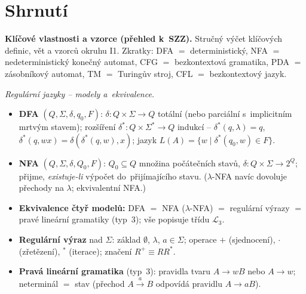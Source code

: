 \documentclass[11pt,a4paper]{article}
\begin{document}
\section*{Shrnutí}

\begin{poznamka}
\textbf{Klíčové vlastnosti a vzorce (přehled k~SZZ).} Stručný výčet klíčových definic, vět a vzorců okruhu I1. Zkratky: DFA $=$ deterministický, NFA $=$ nedeterministický konečný automat, CFG $=$ bezkontextová gramatika, PDA $=$ zásobníkový automat, TM $=$ Turingův stroj, CFL $=$ bezkontextový jazyk.

\smallskip
\emph{Regulární jazyky -- modely a~ekvivalence.}
\begin{itemize}
  \item \textbf{DFA} $(Q,\Sigma,\delta,q_0,F)$: $\delta\colon Q\times\Sigma\to Q$ totální (nebo parciální s~implicitním mrtvým stavem); rozšíření $\delta^*\colon Q\times\Sigma^*\to Q$ indukcí -- $\delta^*(q,\lambda)=q$, $\delta^*(q,wx)=\delta(\delta^*(q,w),x)$; jazyk $L(A)=\{w\mid\delta^*(q_0,w)\in F\}$.
  \item \textbf{NFA} $(Q,\Sigma,\delta,Q_0,F)$: $Q_0\subseteq Q$ množina počátečních stavů, $\delta\colon Q\times\Sigma\to 2^Q$; přijme, \emph{existuje-li} výpočet do~přijímajícího stavu. ($\lambda$-NFA navíc dovoluje přechody na $\lambda$; ekvivalentní NFA.)
  \item \textbf{Ekvivalence čtyř modelů:} DFA $=$ NFA ($\lambda$-NFA) $=$ regulární výrazy $=$ pravé lineární gramatiky (typ~3); vše popisuje třídu $\mathcal L_3$.
  \item \textbf{Regulární výraz} nad $\Sigma$: základ $\emptyset$, $\lambda$, $a\in\Sigma$; operace $+$ (sjednocení), $\cdot$ (zřetězení), ${}^*$ (iterace); značení $R^+\equiv RR^*$.
  \item \textbf{Pravá lineární gramatika} (typ~3): pravidla tvaru $A\to wB$ nebo $A\to w$; neterminál $=$ stav (přechod $A\xrightarrow{a}B$ odpovídá pravidlu $A\to aB$).
\end{itemize}


\end{poznamka}
\end{document}
